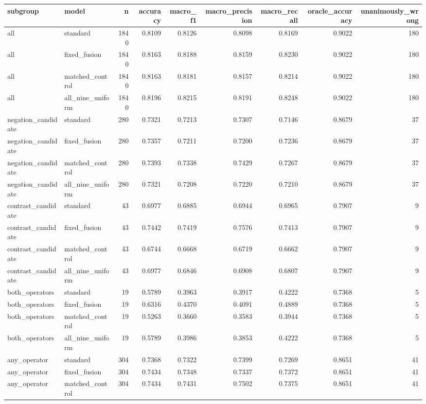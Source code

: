 \begin{tabular}{llrrrrrrr}
\toprule
subgroup & model & n & accuracy & macro\_f1 & macro\_precision & macro\_recall & oracle\_accuracy & unanimously\_wrong \\
\midrule
all & standard & 1840 & 0.8109 & 0.8126 & 0.8098 & 0.8169 & 0.9022 & 180 \\
all & fixed\_fusion & 1840 & 0.8163 & 0.8188 & 0.8159 & 0.8230 & 0.9022 & 180 \\
all & matched\_control & 1840 & 0.8163 & 0.8181 & 0.8157 & 0.8214 & 0.9022 & 180 \\
all & all\_nine\_uniform & 1840 & 0.8196 & 0.8215 & 0.8191 & 0.8248 & 0.9022 & 180 \\
negation\_candidate & standard & 280 & 0.7321 & 0.7213 & 0.7307 & 0.7146 & 0.8679 & 37 \\
negation\_candidate & fixed\_fusion & 280 & 0.7357 & 0.7211 & 0.7200 & 0.7236 & 0.8679 & 37 \\
negation\_candidate & matched\_control & 280 & 0.7393 & 0.7338 & 0.7429 & 0.7267 & 0.8679 & 37 \\
negation\_candidate & all\_nine\_uniform & 280 & 0.7321 & 0.7208 & 0.7220 & 0.7210 & 0.8679 & 37 \\
contrast\_candidate & standard & 43 & 0.6977 & 0.6885 & 0.6944 & 0.6965 & 0.7907 & 9 \\
contrast\_candidate & fixed\_fusion & 43 & 0.7442 & 0.7419 & 0.7576 & 0.7413 & 0.7907 & 9 \\
contrast\_candidate & matched\_control & 43 & 0.6744 & 0.6668 & 0.6719 & 0.6662 & 0.7907 & 9 \\
contrast\_candidate & all\_nine\_uniform & 43 & 0.6977 & 0.6846 & 0.6908 & 0.6807 & 0.7907 & 9 \\
both\_operators & standard & 19 & 0.5789 & 0.3963 & 0.3917 & 0.4222 & 0.7368 & 5 \\
both\_operators & fixed\_fusion & 19 & 0.6316 & 0.4370 & 0.4091 & 0.4889 & 0.7368 & 5 \\
both\_operators & matched\_control & 19 & 0.5263 & 0.3660 & 0.3583 & 0.3944 & 0.7368 & 5 \\
both\_operators & all\_nine\_uniform & 19 & 0.5789 & 0.3986 & 0.3853 & 0.4222 & 0.7368 & 5 \\
any\_operator & standard & 304 & 0.7368 & 0.7322 & 0.7399 & 0.7269 & 0.8651 & 41 \\
any\_operator & fixed\_fusion & 304 & 0.7434 & 0.7348 & 0.7337 & 0.7372 & 0.8651 & 41 \\
any\_operator & matched\_control & 304 & 0.7434 & 0.7431 & 0.7502 & 0.7375 & 0.8651 & 41 \\

\end{tabular}
